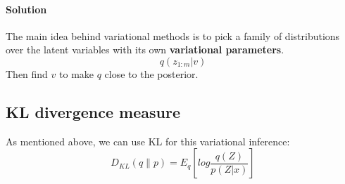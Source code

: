 \documentclass{article}
\begin{document}
\paragraph{Solution} The main idea behind variational methods is to pick a family of distributions over the latent variables with its own \textbf{variational parameters}.
$$q(z_{1:m}|v)$$
Then find $v$ to make $q$ close to the posterior.
\subsection{KL divergence measure}
As mentioned above, we can use KL for this variational inference:
$$D_{KL}(q \parallel p)=E_{q} \left[ log \frac{q(Z)}{p(Z|x)} \right]$$
\end{document}
